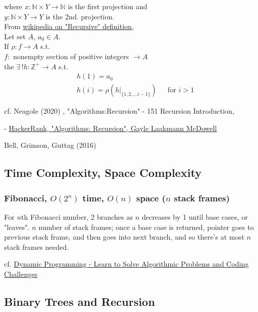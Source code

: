 \documentclass[10pt]{amsart}
\begin{document}
\begin{multicols*}{2}
where $x: \mathbb{N} \times Y \to \mathbb{N}$ is the first projection and \\
\phantom{where } $y : \mathbb{N} \times Y \to Y$ is the 2nd. projection.  \\

From \href{https://en.wikipedia.org/wiki/Recursive_definition}{wikipedia on "Recursive" definition}, \\
Let set $A$, $a_0 \in A$. \\
If $\rho : f \to A$ s.t. \\
\phantom{If $\rho $ } $f: $ nonempty section of positive integers $\to A$ \\
the $\exists \, ! h : \mathbb{Z}^+ \to A$ s.t. \\
\begin{equation}
\begin{aligned}
& h(1) = a_0 \\ 
& h(i) = \rho( \left. h \right|_{\lbrace 1, 2, \dots i -1 \rbrace }) \quad \, \text{ for } i > 1
\end{aligned}
\end{equation}


cf. Neagole (2020) \cite{Neag2020}, "Algorithms:Recursion" - 151 Recursion Introduction, 


- \href{https://youtu.be/KEEKn7Me-ms}{HackerRank, "Algorithms: Recursion",  Gayle Laakmann McDowell}

Bell, Grimson, Guttag (2016) \cite{BGG2016}

\subsection{Time Complexity, Space Complexity}

\subsubsection{Fibonacci, $O(2^n)$ time, $O(n)$ space ($n$ stack frames)}

For $n$th Fibonacci number, 2 branches as $n$ decreases by 1 until base cases, or "leaves". $n$ number of stack frames; once a base case is returned, pointer goes to previous stack frame, and then goes into next branch, and so there's at most $n$ stack frames needed.

cf. \href{https://youtu.be/oBt53YbR9Kk?t=1190}{Dynamic Programming - Learn to Solve Algorithmic Problems and Coding Challenges}

\subsection{Binary Trees and Recursion}


\end{multicols*}
\end{document}
